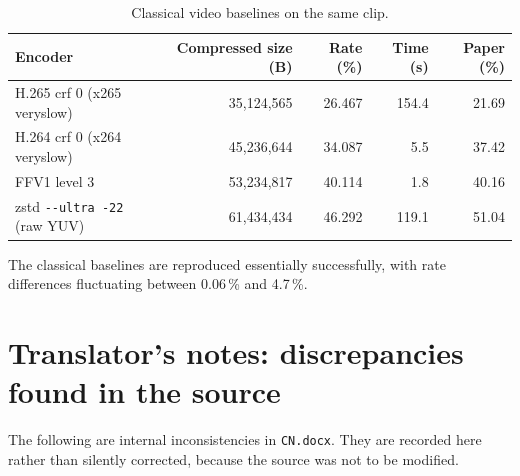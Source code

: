 \documentclass[12pt,a4paper]{article}
\begin{document}
\begin{table}[htbp]\centering\small
\caption{Classical video baselines on the same clip.}
\begin{tabular}{@{}lrrrr@{}}
\toprule
Encoder & Compressed size (B) & Rate (\%) & Time (s) & Paper (\%) \\
\midrule
H.265 crf 0 (x265 veryslow) & 35{,}124{,}565 & 26.467 & 154.4 & 21.69 \\
H.264 crf 0 (x264 veryslow) & 45{,}236{,}644 & 34.087 & 5.5 & 37.42 \\
FFV1 level 3 & 53{,}234{,}817 & 40.114 & 1.8 & 40.16 \\
zstd \texttt{-{}-ultra -22} (raw YUV) & 61{,}434{,}434 & 46.292 & 119.1 & 51.04 \\
\bottomrule
\end{tabular}
\end{table}

The classical baselines are reproduced essentially successfully, with rate differences
fluctuating between 0.06\,\% and 4.7\,\%.

\appendix
\section{Translator's notes: discrepancies found in the source}

The following are internal inconsistencies in \texttt{CN.docx}. They are recorded here rather
than silently corrected, because the source was not to be modified.
\end{document}
